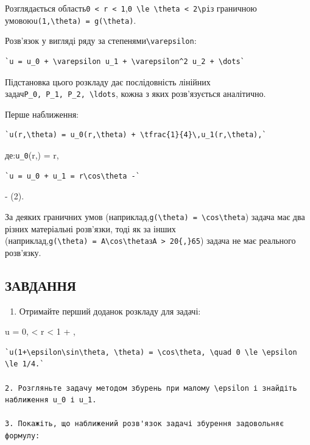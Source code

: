 \documentclass[
  ukrainian,
]{article}
\providecommand{\tightlist}{%
  \setlength{\itemsep}{0pt}\setlength{\parskip}{0pt}}
\begin{document}
Розглядається
область\texttt{0\ \textless{}\ r\ \textless{}\ 1},\texttt{0\ \textbackslash{}le\ \textbackslash{}theta\ \textless{}\ 2\textbackslash{}pi}з
граничною
умовою\texttt{u(1,\textbackslash{}theta)\ =\ g(\textbackslash{}theta)}.

Розв'язок у вигляді ряду за
степенями\texttt{\textbackslash{}varepsilon}:

\begin{verbatim}
`u = u_0 + \varepsilon u_1 + \varepsilon^2 u_2 + \dots`
\end{verbatim}

Підстановка цього розкладу дає послідовність лінійних
задач\texttt{P\_0,\ P\_1,\ P\_2,\ \textbackslash{}ldots}, кожна з яких
розв'язується аналітично.

Перше наближення:

\begin{verbatim}
`u(r,\theta) = u_0(r,\theta) + \tfrac{1}{4}\,u_1(r,\theta),`
\end{verbatim}

де:\texttt{u\_0}(r,\theta) = r\cos\theta,

\begin{verbatim}
`u = u_0 + u_1 = r\cos\theta -`
\end{verbatim}

 - \cos(2\theta).

За деяких граничних умов
(наприклад,\texttt{g(\textbackslash{}theta)\ =\ \textbackslash{}cos\textbackslash{}theta})
задача має два різних матеріальні розв'язки, тоді як за інших
(наприклад,\texttt{g(\textbackslash{}theta)\ =\ A\textbackslash{}cos\textbackslash{}theta}з\texttt{A\ \textgreater{}\ 20\{,\}65})
задача не має реального розв'язку.

\subsection{ЗАВДАННЯ}\label{ux437ux430ux432ux434ux430ux43dux43dux44f-11}

\begin{enumerate}
\def\labelenumi{\arabic{enumi}.}
\tightlist
\item
  Отримайте перший доданок розкладу для задачі:
\end{enumerate}

\Delta u = 0,  \textless{} r \textless{} 1 + \epsilon\sin\theta,

\begin{verbatim}
`u(1+\epsilon\sin\theta, \theta) = \cos\theta, \quad 0 \le \epsilon \le 1/4.`

2. Розгляньте задачу методом збурень при малому \epsilon і знайдіть наближення u_0 і u_1.

3. Покажіть, що наближений розв'язок задачі збурення задовольняє формулу:
\end{verbatim}
\end{document}
